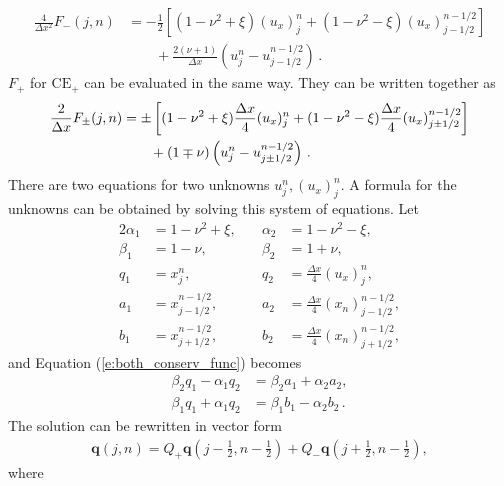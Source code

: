 \documentclass[letterpaper,12pt,dvips]{article}
\renewcommand{\vec}[1]{\mathbf{#1}}
\numberwithin{equation}{section}
\begin{document}
\begin{align*}
  \frac{4}{\Delta x^2}F_-(j,n) &= 
    -\frac{1}{2}\left[
      (1-\nu^2+\xi)(u_x)_j^n + (1-\nu^2-\xi)(u_x)_{j-1/2}^{n-1/2}
    \right] \\
  &\quad\quad 
  + \frac{2(\nu+1)}{\Delta x}\left(u_j^n-u_{j-1/2}^{n-1/2}\right) \,. 
\end{align*}
$F_+$ for $\mathrm{CE}_+$ can be evaluated in the same way.
They can be written together as
\begin{align}
  \frac{2}{\Delta x}F_{\pm}(j,n) &= 
    \pm\left[
        (1-\nu^2+\xi)\frac{\Delta x}{4}(u_x)_j^n
      + (1-\nu^2-\xi)\frac{\Delta x}{4}(u_x)_{j\pm1/2}^{n-1/2}
    \right] \notag \\
  &\quad\quad
  + (1\mp\nu)\left(u_j^n-u_{j\pm1/2}^{n-1/2}\right)\,. 
    \label{e:both_conserv_func}
\end{align}
There are two equations for two unknowns $u_j^n, (u_x)_j^n$.
A formula for the unknowns can be obtained by solving this system of 
equations.
Let
\begin{alignat*}{2}
  \alpha_1 &= 1-\nu^2+\xi,\quad &\alpha_2 &= 1-\nu^2-\xi, \\
  \beta_1 &= 1-\nu, &\beta_2 &= 1+\nu, \\
  q_1 &= x_j^n, &q_2 &= \frac{\Delta x}{4}(u_x)_j^n, \\
  a_1 &= x_{j-1/2}^{n-1/2}, 
 &a_2 &= \frac{\Delta x}{4}(x_n)_{j-1/2}^{n-1/2}, \\
  b_1 &= x_{j+1/2}^{n-1/2}, 
 &b_2 &= \frac{\Delta x}{4}(x_n)_{j+1/2}^{n-1/2}, 
\end{alignat*}
and Equation (\ref{e:both_conserv_func}) becomes
\begin{align*}
  \beta_2q_1 - \alpha_1q_2 &= \beta_2a_1 + \alpha_2a_2, \\
  \beta_1q_1 + \alpha_1q_2 &= \beta_1b_1 - \alpha_2b_2\,.
\end{align*}
The solution can be rewritten in vector form
\begin{align*}
  \vec{q}(j,n) = 
    Q_+\vec{q}(j-\frac{1}{2},n-\frac{1}{2})
  + Q_-\vec{q}(j+\frac{1}{2},n-\frac{1}{2}), 
\end{align*}
where
\end{document}
